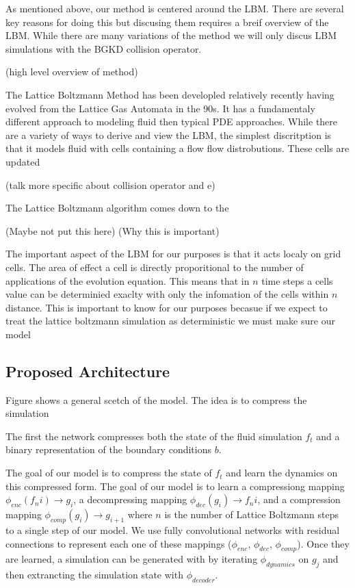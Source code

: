 \documentclass{article}
\begin{document}
As mentioned above, our method is centered around the LBM. There are several key reasons for doing this but discusing them requires a breif overview of the LBM. While there are many variations of the method we will only discus LBM simulations with the BGKD collision operator. 

(high level overview of method)

The Lattice Boltzmann Method has been developled relatively recently having evolved from the Lattice Gas Automata in the 90s. It has a fundamentaly different approach to modeling fluid then typical PDE approaches. While there are a variety of ways to derive and view the LBM, the simplest discritption is that it models fluid with cells containing a flow flow distrobutions. These cells are updated 

(talk more specific about collision operator and e)

The Lattice Boltzmann algorithm comes down to the 

(Maybe not put this here)
(Why this is important)

The important aspect of the LBM for our purposes is that it acts localy on grid cells. The area of effect a cell is directly proporitional to the number of applications of the evolution equation. This means that in $n$ time steps a cells value can be determinied exaclty with only the infomation of the cells within $n$ distance. This is important to know for our purposes becasue if we expect to treat the lattice boltzmann simulation as deterministic we must make sure our model 

\subsection{Proposed Architecture}

Figure \cite{fig_1} shows a general scetch of the model. The idea is to compress the simulation 

The first the network compresses both the state of the fluid simulation $f_t$ and a binary representation of the boundary conditions $b$.

The goal of our model is to compress the state of $f_t$ and learn the dynamics on this compressed form. 
The goal of our model is to learn a compressiong mapping $\phi_{enc}(f_ni) \rightarrow g_i$, a decompressing mapping $\phi_{dec}(g_i) \rightarrow f_ni$, and a compression mapping $\phi_{comp}(g_i) \rightarrow g_{i+1}$ where $n$ is the number of Lattice Boltzmann steps to a single step of our model. We use fully convolutional networks with residual connections to represent each one of these mappings ($\phi_{enc}$, $\phi_{dec}$, $\phi_{comp}$). Once they are learned, a simulation can be generated with by iterating $\phi_{dynamics}$ on $g_j$ and then extrancting the simulation state with $\phi_{decoder}$.
\end{document}
